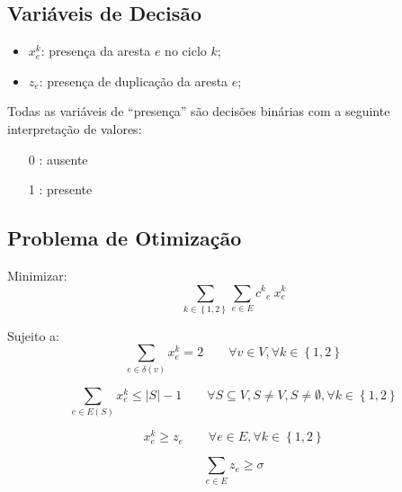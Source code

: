 \documentclass{article}
\newcommand{\Set}[1]{\ensuremath{\left\{#1\right\}}}
\newcommand{\Sum}[1]{\ensuremath{\displaystyle\sum\limits_{#1}}}
\newcommand{\abs}[1]{\ensuremath{\left| #1 \right|}}
\newcommand{\edge}{\ensuremath{e}}
\newcommand{\edges}{\ensuremath{E}}
\newcommand{\vertex}{\ensuremath{v}}
\newcommand{\vertices}{\ensuremath{V}}
\newcommand{\ncycles}{2}
\newcommand{\allCycles}{\ensuremath{\Set{1, \ncycles}}}
\newcommand{\cycle}{\ensuremath{k}}
\newcommand{\subvertices}{\ensuremath{S}}
\newcommand{\cost}[1]{\ensuremath{c^{#1}}}
\newcommand{\costke}{\ensuremath{\cost{\cycle}_{\edge}}}
\newcommand{\X}[2]{\ensuremath{x^{#1}_{#2}}}
\newcommand{\xke}{\ensuremath{\X{\cycle}{\edge}}}
\newcommand{\ze}{\ensuremath{z_{\edge}}}
\newcommand{\similarity}{\ensuremath{\sigma}}
\begin{document}
\subsection{Variáveis de Decisão}
\label{constraint:variables}

\begin{itemize}
	\item $\xke$: presença da aresta $\edge$ no ciclo $\cycle$;
	\item $\ze$: presença de duplicação da aresta $\edge$;
\end{itemize}

Todas as variáveis de ``presença'' são decisões binárias com a seguinte interpretação de valores:

\begin{itemize}
	\item[0]: ausente
	\item[1]: presente
\end{itemize}

\subsection{Problema de Otimização}
\label{subsec:problem}

Minimizar:
\begin{equation}
    \label{eq:goal}
 	\Sum{\cycle \in \allCycles}
 	\Sum{\edge \in \edges}
 	\costke \ \xke
\end{equation}

Sujeito a:
\begin{equation}
	\label{constraint:vertex presence}
	\Sum{\edge \in \delta(\vertex)} \xke = 2
	\qquad
	\forall \vertex \in \vertices,
	\forall \cycle \in \allCycles
\end{equation}

\begin{equation}
	\label{constraint:no subcycle}
	\Sum{\edge \in \edges(\subvertices)} \xke \leqslant \abs{\subvertices} - 1
	\qquad
	\forall
		\subvertices \subseteq \vertices,
		\subvertices \neq \vertices,
		\subvertices \neq \emptyset,
		\forall \cycle \in \allCycles
\end{equation}

\begin{equation}
	\label{constraint:similarity compatibility}
	\xke \geqslant \ze
	\qquad
	\forall \edge \in \edges,
	\forall \cycle \in \allCycles
\end{equation}

\begin{equation}
	\label{constraint:similarity}
	\Sum{\edge \in \edges} \ze \geqslant \similarity
\end{equation}
\end{document}
